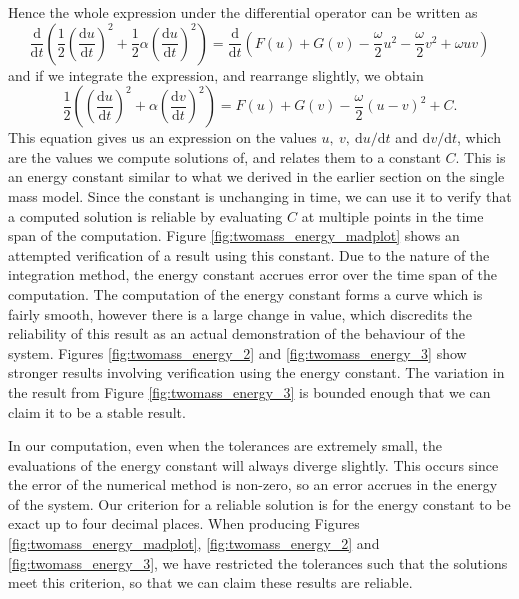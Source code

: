 Hence the whole expression under the differential operator can be written as
\begin{equation*}
    \frac{\mathrm{d}}{\mathrm{d}t}\left(
        \frac{1}{2}\left(\frac{\mathrm{d}u}{\mathrm{d}t}\right)^2 + \frac{1}{2}\alpha\left(\frac{\mathrm{d}u}{\mathrm{d}t}\right)^2
    \right) = \frac{\mathrm{d}}{\mathrm{d}t}\left(
        F(u) + G(v) - \frac{\omega}{2}u^2 -\frac{\omega}{2}v^2 + \omega uv
    \right) 
\end{equation*}
and if we integrate the expression, and rearrange slightly, we obtain
\begin{equation}
    \frac{1}{2}\left(
        \left(\frac{\mathrm{d}u}{\mathrm{d}t}\right)^2 + \alpha \left(\frac{\mathrm{d}v}{\mathrm{d}t}\right)^2
    \right) = F(u) + G(v) - \frac{\omega}{2}(u-v)^2 + C.
    \label{eqn:twomass_energy_constant}
\end{equation}
This equation gives us an expression on the values \(u,~v,~\mathrm{d}u/\mathrm{d}t\) and \(\mathrm{d}v/\mathrm{d}t\),
which are the values we compute solutions of, and relates them to a constant $C$.
This is an energy constant similar to what we derived in the earlier section on the single mass model.
Since the constant is unchanging in time, we can use it to verify that a computed solution is reliable by evaluating $C$ at multiple points in the time span of the computation.
Figure \ref{fig:twomass_energy_madplot} shows an attempted verification of a result using this constant.
Due to the nature of the integration method,
the energy constant accrues error over the time span of the computation.
The computation of the energy constant forms a curve which is fairly smooth,
however there is a large change in value,
which discredits the reliability of this result as an actual demonstration of the behaviour of the system.
Figures \ref{fig:twomass_energy_2} and \ref{fig:twomass_energy_3} show stronger results involving verification using the energy constant.
The variation in the result from Figure \ref{fig:twomass_energy_3} is bounded enough that we can claim it to be a stable result.

In our computation, even when the tolerances are extremely small,
the evaluations of the energy constant will always diverge slightly.
This occurs since the error of the numerical method is non-zero,
so an error accrues in the energy of the system.
Our criterion for a reliable solution is for the energy constant to be exact up to four decimal places.
When producing Figures \ref{fig:twomass_energy_madplot}, \ref{fig:twomass_energy_2} and \ref{fig:twomass_energy_3}, we have restricted the tolerances such that the solutions meet this criterion,
so that we can claim these results are reliable.


